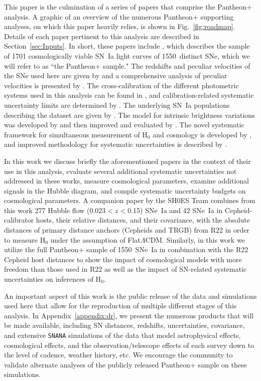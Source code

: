 \documentclass[twocolumn]{aastex63}
\def\nunique{1550}
\begin{document}
This paper is the culmination of a series of papers that comprise the Pantheon+ analysis.  
A graphic of an overview of the numerous Pantheon+ supporting analyses, on which this paper heavily relies, is shown in Fig.~\ref{fig:roadmap}.
Details of each paper pertinent to this analysis are described in Section~\ref{sec:Inputs}. In short, these papers include \cite[][hereafter S22]{plussample}, which describes the sample of 1701 cosmologically viable SN~Ia light curves {of \nunique\ distinct SNe}, which we will refer to as ``the Pantheon+ sample." The redshifts and peculiar velocities of the SNe used here are given by \cite{carr21} and a comprehensive analysis of peculiar velocities is presented by \cite{peterson21}. The cross-calibration of the different photometric systems used in this analysis can be found in \cite[][hereafter Fragilistic]{fragilistic}, and calibration-related systematic uncertainty limits are determined by \cite{brownsberger21}. The underlying SN~Ia populations describing the dataset are given by \cite{popovic21a}. The model for intrinsic {brightness} variations was developed by \cite{bs20} and then improved and evaluated by \cite{popovic21b}. The novel systematic framework for simultaneous measurement of H$_0$ and cosmology is developed by \cite{dhawan20H0}, and {improved methodology for systematic uncertainties is described by} \cite{binning21}. 

In this work we discuss briefly the aforementioned papers in the context of their use in this analysis, evaluate several additional systematic uncertainties not addressed in these works, measure cosmological parameters, {examine additional signals in the Hubble diagram}, and compile systematic uncertainty budgets on cosmological parameters. A companion paper by the SH0ES Team \citep[][hereafter R22]{SH0ES21} combines {from this work 277 Hubble flow (0.023$<z<$0.15) SNe~Ia and 42 SNe~Ia in Cepheid-calibrator hosts, their relative distances, and their covariance, with the absolute distances of primary distance anchors (Cepheids and TRGB) from R22 in order to measure H$_0$ under the assumption of Flat$\Lambda$CDM. Similarly, in this work we utilize the full Pantheon+ sample of \nunique\ SNe~Ia in combination with the R22 Cepheid host distances to show the impact of cosmological models with more freedom than those used in R22 as well as the impact of SN-related systematic uncertainties on inferences of H$_0$.}

An important aspect of this work is the public release of the data and simulations used here that allow for the reproduction of multiple different stages of this analysis. In Appendix~\ref{appendix:dr}, we present the numerous products that will be made available, including SN distances, redshifts, uncertainties, covariance, and extensive \texttt{SNANA} simulations \citep{Kessler2009} of the data that model astrophysical effects, cosmological effects, and the observation/telescope effects of each survey down to the level of cadence, weather history, etc. We encourage the community to validate alternate analyses {of the publicly released Pantheon+ sample} on these simulations.
\end{document}
